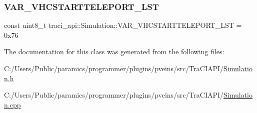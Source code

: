 \subsubsection{\texorpdfstring{V\+A\+R\+\_\+\+V\+H\+C\+S\+T\+A\+R\+T\+T\+E\+L\+E\+P\+O\+R\+T\+\_\+\+L\+ST}{VAR\_VHCSTARTTELEPORT\_LST}}
{\footnotesize\ttfamily const uint8\+\_\+t traci\+\_\+api\+::\+Simulation\+::\+V\+A\+R\+\_\+\+V\+H\+C\+S\+T\+A\+R\+T\+T\+E\+L\+E\+P\+O\+R\+T\+\_\+\+L\+ST = 0x76\hspace{0.3cm}{\ttfamily [static]}}



The documentation for this class was generated from the following files\+:\begin{DoxyCompactItemize}
\item 
C\+:/\+Users/\+Public/paramics/programmer/plugins/pveins/src/\+Tra\+C\+I\+A\+P\+I/\hyperlink{_simulation_8h}{Simulation.\+h}\item 
C\+:/\+Users/\+Public/paramics/programmer/plugins/pveins/src/\+Tra\+C\+I\+A\+P\+I/\hyperlink{_simulation_8cpp}{Simulation.\+cpp}\end{DoxyCompactItemize}
